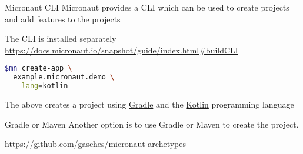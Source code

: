 \documentclass{beamer}
\begin{document}
\begin{frame}[t,fragile]{Micronaut CLI}
Micronaut provides a CLI which can be used to create projects and add features to the projects

The CLI is installed separately
{\footnotesize \href{https://docs.micronaut.io/snapshot/guide/index.html\#buildCLI}{https://docs.micronaut.io/snapshot/guide/index.html\#buildCLI}}

\vspace{16pt}
\begin{lstlisting}[language=bash, backgroundcolor = \color{green!5}]
$mn create-app \
  example.micronaut.demo \
  --lang=kotlin
\end{lstlisting}

The above creates a project using \href{https://gradle.org/}{Gradle} and the \href{https://kotlinlang.org/}{Kotlin} programming language
\end{frame}


\begin{frame}[t]{Gradle or Maven}
Another option is to use Gradle or Maven to create the project.

https://github.com/gasches/micronaut-archetypes
\end{frame}
\end{document}
